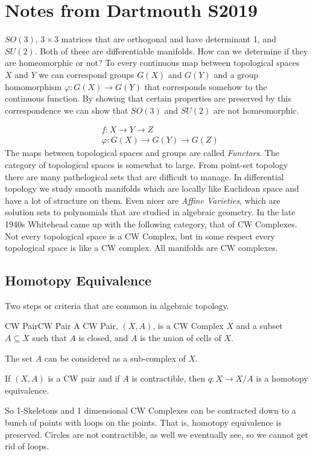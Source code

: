 \documentclass{book}                                                           %
\begin{document}
    \section{Notes from Dartmouth S2019}
    \begin{example}
        $SO(3)$, $3\times{3}$ matrices that are orthogonal and have determinant
        1, and $SU(2)$. Both of these are differentiable manifolds. How can we
        determine if they are homeomorphic or not? To every continuous map
        between topological spaces $X$ and $Y$ we can correspond groups $G(X)$
        and $G(Y)$ and a group homomorphism $\varphi:G(X)\rightarrow{G}(Y)$ that
        corresponds somehow to the continuous function. By showing that certain
        properties are preserved by this correspondence we can show that $SO(3)$
        and $SU(2)$ are not homeomorphic.
    \end{example}
    \begin{align}
        &f:X\rightarrow{Y}\rightarrow{Z}\\
        &\varphi:G(X)\rightarrow{G}(Y)\rightarrow{G}(Z)
    \end{align}
    The maps between topological spaces and groups are called \textit{Functors}.
    The category of topological spaces is somewhat to large. From point-set
    topology there are many pathelogical sets that are difficult to manage. In
    differential topology we study smooth manifolds which are locally like
    Euclidean space and have a lot of structure on them. Even nicer are
    \textit{Affine Varieties}, which are solution sets to polynomials that are
    studied in algebraic geometry. In the late 1940s Whitehead came up with the
    following category, that of CW Complexes. Not every topological space is a
    CW Complex, but in some respect every topological space is like a CW
    complex. All manifolds are CW complexes.
    \subsection{Homotopy Equivalence}
        Two steps or criteria that are common in algebraic
        topology.
        \begin{ldefinition}{CW Pair}{CW Pair}
            A CW Pair, $(X,A)$, is a CW Complex $X$ and a
            subset $A\subseteq{X}$ such that $A$ is closed,
            and $A$ is the union of cells of $X$.
        \end{ldefinition}
        The set $A$ can be considered as a sub-complex
        of $X$.
        \begin{theorem}
            If $(X,A)$ is a CW pair and if $A$ is
            contractible, then $q:X\rightarrow{X}/A$
            is a homotopy equivalence.
        \end{theorem}
        So 1-Skeletons and 1 dimensional CW Complexes can
        be contracted down to a bunch of points with loops
        on the points. That is, homotopy equivalence is
        preserved. Circles are not contractible, as well
        we eventually see, so we cannot get rid of loops.
\end{document}
